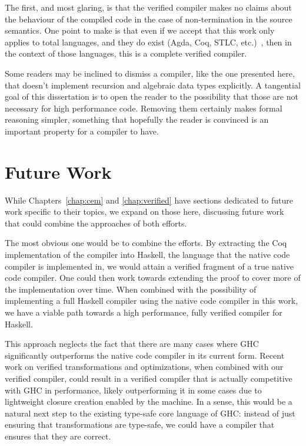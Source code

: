 The first, and most glaring, is that the verified compiler makes no claims about
the behaviour of the compiled code in the case of non-termination in the source
semantics. One point to make is that even if we accept that this work only
applies to total languages, and they do exist (Agda, Coq, STLC,
etc.)~\cite{turner2004total}, then in the context of those languages, this is a
complete verified compiler. 

Some readers may be inclined to dismiss a compiler, like the one presented here,
that doesn't implement recursion and algebraic data types explicitly. A
tangential goal of this dissertation is to open the reader to the possibility
that those are not necessary for high performance code. Removing them certainly
makes formal reasoning simpler, something that hopefully the reader is convinced
is an important property for a compiler to have.  

\section{Future Work}\label{sec:future}

While Chapters~\ref{chap:cem} and \ref{chap:verified} have sections dedicated to
future work specific to their topics, we expand on those here, discussing future
work that could combine the approaches of both efforts. 

The most obvious one would be to combine the efforts. By extracting the Coq
implementation of the compiler into Haskell, the language that the native code
compiler is implemented in, we would attain a verified fragment of a true native
code compiler. One could then work towards extending the proof to cover more of
the implementation over time. When combined with the possibility of implementing
a full Haskell compiler using the native code compiler in this work, we have a
viable path towards a high performance, fully verified compiler for Haskell. 

This approach neglects the fact that there are many cases where GHC
significantly outperforms the native code compiler in its current form. Recent
work on verified transformations and optimizations, when combined with our
verified compiler, could result in a verified compiler that is actually
competitive with GHC in performance, likely outperforming it in some cases due
to lightweight closure creation enabled by the \ce machine. In a sense, this
would be a natural next step to the existing type-safe core language of GHC:
instead of just ensuring that transformations are type-safe, we could have a
compiler that ensures that they are correct.

